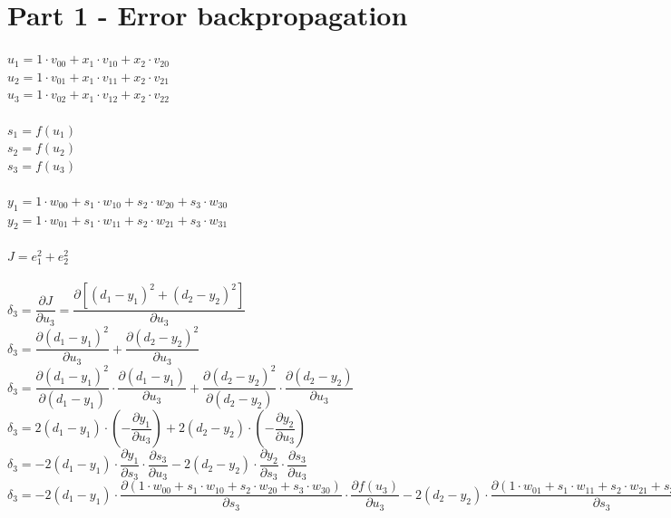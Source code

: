 \documentclass[a4paper]{article}    %
\begin{document}
\bigskip

\section{Part 1 - Error backpropagation}

$ u_1 = 1 \cdot v_{00} + x_1 \cdot v_{10} + x_2 \cdot v_{20} $\\
$ u_2 = 1 \cdot v_{01} + x_1 \cdot v_{11} + x_2 \cdot v_{21} $\\
$ u_3 = 1 \cdot v_{02} + x_1 \cdot v_{12} + x_2 \cdot v_{22} $\\
\vspace{0.1mm}\\
$ s_1 = f(u_1) $\\
$ s_2 = f(u_2) $\\
$ s_3 = f(u_3) $\\
\vspace{0.1mm}\\
$ y_1 = 1 \cdot w_{00} + s_1 \cdot w_{10} + s_2 \cdot w_{20} + s_3 \cdot w_{30} $\\
$ y_2 = 1 \cdot w_{01} + s_1 \cdot w_{11} + s_2 \cdot w_{21} + s_3 \cdot w_{31} $\\
\vspace{0.1mm}\\
$ J = e_1^2 + e_2^2 $\\
\vspace{0.1mm}\\
$ \delta_3 = \dfrac{\partial J}{\partial u_3} = \dfrac{\partial [(d_1-y_1)^2+(d_2-y_2)^2]}{\partial u_3} $\\
$ \delta_3 = \dfrac{\partial (d_1-y_1)^2}{\partial u_3} + \dfrac{\partial (d_2-y_2)^2}{\partial u_3} $\\
$ \delta_3 = \dfrac{\partial (d_1-y_1)^2}{\partial (d_1-y_1)} \cdot \dfrac{\partial (d_1-y_1)}{\partial u_3} + \dfrac{\partial (d_2-y_2)^2}{\partial (d_2-y_2)} \cdot \dfrac{\partial (d_2-y_2)}{\partial u_3} $\\
$ \delta_3 = 2(d_1-y_1) \cdot \left(-\dfrac{\partial y_1}{\partial u_3}\right) + 2(d_2-y_2) \cdot \left(-\dfrac{\partial y_2}{\partial u_3}\right) $\\
$ \delta_3 = - 2(d_1-y_1) \cdot \dfrac{\partial y_1}{\partial s_3} \cdot \dfrac{\partial s_3}{\partial u_3} - 2(d_2-y_2) \cdot \dfrac{\partial y_2}{\partial s_3} \cdot \dfrac{\partial s_3}{\partial u_3} $\\
$ \delta_3 = - 2(d_1-y_1) \cdot \dfrac{\partial (1 \cdot w_{00} + s_1 \cdot w_{10} + s_2 \cdot w_{20} + s_3 \cdot w_{30})}{\partial s_3} \cdot \dfrac{\partial f(u_3)}{\partial u_3} - 2(d_2-y_2) \cdot \dfrac{\partial (1 \cdot w_{01} + s_1 \cdot w_{11} + s_2 \cdot w_{21} + s_3 \cdot w_{31})}{\partial s_3} \cdot \dfrac{\partial f(u_3)}{\partial u_3} $\\
\end{document}
